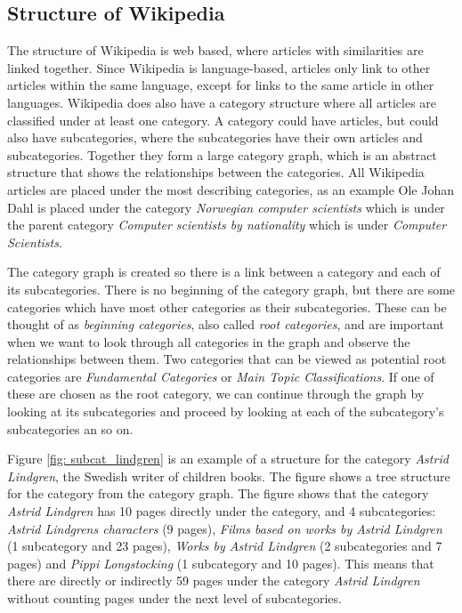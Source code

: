 \subsection{Structure of Wikipedia}
The structure of Wikipedia is web based, where articles with similarities are linked together. Since Wikipedia is language-based, articles only link to other articles within the same language, except for links to the same article in other languages. Wikipedia does also have a category structure where all articles are classified under at least one category. A category could have articles, but could also have subcategories, where the subcategories have their own articles and subcategories. Together they form a large category graph, which is an abstract structure that shows the relationships between the categories. All Wikipedia articles are placed under the most describing categories, as an example Ole Johan Dahl 
is placed under the category \emph{Norwegian computer scientists} which is under the parent category \emph{Computer scientists by nationality} which is under \emph{Computer Scientists}. 

The category graph is created so there is a link between a category and each of its subcategories. There is no beginning of the category graph, but there are some categories which have most other categories as their subcategories. These can be thought of as \emph{beginning categories}, also called \emph{root categories}, and are important when we want to look through all categories in the graph and observe the relationships between them.  Two categories that can be viewed as potential root categories are \emph{Fundamental Categories} or \emph{Main Topic Classifications}. If one of these are chosen as the root category, we can continue through the graph by looking at its subcategories and proceed by looking at each of the subcategory's subcategories an so on.

Figure \ref{fig: subcat_lindgren} is an example of a structure for the category \emph{Astrid Lindgren}, the Swedish writer of children books. The figure shows a tree structure for the category from the category graph. The figure shows that the category \emph{Astrid Lindgren} has 10 pages directly under the category, and 4 subcategories: \emph{Astrid Lindgrens characters} (9 pages), \emph{Films based on works by Astrid Lindgren} (1 subcategory and 23 pages), \emph{Works by Astrid Lindgren} (2 subcategories and 7 pages) and \emph{Pippi Longstocking} (1 subcategory and 10 pages).  This means that there are directly or indirectly 59 pages under the category \emph{Astrid Lindgren} without counting pages under the next level of subcategories. 


